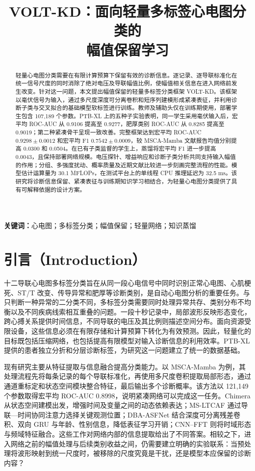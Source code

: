 \documentclass[11pt,a4paper,UTF8,fontset=windows]{ctexart}
\title{\textbf{VOLT-KD：面向轻量多标签心电图分类的\\幅值保留学习}}
\author{}
\date{}
\begin{document}
\maketitle
\vspace{-2em}
\begin{abstract}
轻量心电图分类需要在有限计算预算下保留有效的诊断信息。逐记录、逐导联标准化在统一信号尺度的同时消除了绝对电压及导联幅值比例，使幅值相关信息在进入网络前发生改变。针对这一问题，本文提出幅值保留的轻量多标签分类框架 VOLT-KD。该框架以毫伏信号为输入，通过多尺度深度可分离卷积和短序列建模形成紧凑表征，并利用诊断子类与交叉拟合的基础模型软标签进行训练。教师及辅助头仅在训练期使用，部署学生包含 107,189 个参数。PTB-XL 上的五种子实验表明，同一学生采用毫伏输入后，宏平均 ROC-AUC 从 0.9106 提高至 0.9277，肥厚类别 ROC-AUC 从 0.8285 提高至 0.9019；第二种紧凑骨干呈现一致改善。完整框架达到宏平均 ROC-AUC $0.9298\pm0.0012$ 和宏平均 F1 $0.7542\pm0.0009$，较 MSCA-Mamba 文献报告均值分别提高 0.0300 和 0.0504。在已有子类监督的学生上，蒸馏将宏平均 F1 进一步提高 0.0043，且保持部署网络规模。电压探针、增益响应和诊断子类分析共同支持输入幅值的作用；分组、多强度扰动、概率质量及近期文献比较进一步刻画完整流程的性能。模型估计运算量为 30.1 MFLOPs，在测试平台上的单线程 CPU 推理延迟为 32.5 ms。该研究将诊断信息保留、紧凑表征与训练期知识学习相结合，为轻量心电图分类提供了具有可解释依据的设计方案。
\end{abstract}
\noindent\textbf{关键词：}心电图；多标签分类；幅值保留；轻量网络；知识蒸馏

\section{引言（Introduction）}
十二导联心电图多标签分类旨在从同一段心电信号中同时识别正常心电图、心肌梗死、ST/T 改变、传导异常和肥厚等诊断类别，是自动心电图分析的重要任务\cite{wagner2020}。与只判断一种异常的二分类不同，多标签分类需要同时处理异常共存、类别分布不均衡以及不同疾病线索相互重叠的问题。一段十秒记录中，局部波形反映形态变化，跨心搏关系提供时间信息，不同导联的电压及其比例则描述空间分布。面向资源受限设备，这些信息必须在有限存储和计算预算下转化为有效预测。因此，轻量化的目标既包括压缩网络，也包括提高有限模型对输入诊断信息的利用效率。PTB-XL 提供的患者独立分折和分层诊断标签，为研究这一问题建立了统一的数据基础\cite{wagner2020}。

现有研究主要从特征提取与信息融合提高分类能力。以 MSCA-Mamba\cite{cetintas2026} 为例，其处理流程先将每条记录的每个导联标准化，再使用多尺度卷积提取局部形态，通过通道重标定和状态空间模块整合特征，最后输出多个诊断概率。该方法以 121,149 个参数取得宏平均 ROC-AUC 0.8998，说明紧凑网络可以完成这一任务。Chimera\cite{behrouz2024} 从状态空间建模出发，增强时间及变量之间的动态依赖表达；MS-LTCAF\cite{feng2025} 通过导联—时间协同注意力选择关键观测位置；DBA-ASFNet\cite{luo2025} 结合深度可分离残差卷积、双向 GRU 与年龄、性别信息，降低表征学习开销；CNN--FFT\cite{malik2026} 则将时域形态与频域特征融合。这些工作对网络内部的信息提取给出了不同答案。相较之下，进入网络之前的幅值处理与后续类别收益之间，仍需要建立明确的实验联系：当预处理将波形映射到统一尺度时，被移除的尺度究竟是干扰，还是模型本应保留的诊断内容？
\end{document}
